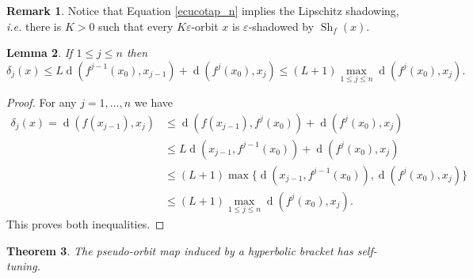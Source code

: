 \documentclass[12pt]{amsart}
\theoremstyle{plain}
\newtheorem{thm}{Theorem}[section]
\newtheorem{lem}[thm]{Lemma}
\theoremstyle{definition}
\newtheorem{rmk}[thm]{Remark}
\theoremstyle{remark}
\DeclareMathOperator{\dist}{d}
\DeclareMathOperator{\shm}{Sh}
\renewcommand{\epsilon}{\varepsilon}
\begin{document}
\begin{rmk}
	\label{rmkLipsSh}
	Notice that
	Equation \eqref{ecucotap_n}
	implies the Lipschitz shadowing, \textit{i.e.} there is $K>0$ such that every $K\epsilon$-orbit $x$ is $\epsilon$-shadowed by $\shm_f(x)$.
\end{rmk}

\begin{lem}
	\label{lemOrbPoCotas}
	If $1\leq j\leq n$ then
	\[
	\delta_j(x)\leq L\dist(f^{j-1}(x_0),x_{j-1})+\dist(f^j(x_0),x_j)
	\leq (L+1)\max_{1\leq j\leq n}\dist(f^j(x_0),x_j).
	\]
\end{lem}

\begin{proof}
	For any $j=1,\dots,n$ we have
	\begin{align*}
		\delta_j(x)=\dist(f(x_{j-1}),x_j)
		&\leq\dist(f(x_{j-1}),f^j(x_0))+\dist(f^j(x_0),x_j)		\\
		&\leq L \dist(x_{j-1},f^{j-1}(x_0))+\dist(f^j(x_0),x_j)\\
		&\leq (L+1)\max\{\dist(x_{j-1},f^{j-1}(x_0)),\dist(f^j(x_0),x_j)\}\\
		&\leq (L+1)\max_{1\leq j\leq n}\dist(f^j(x_0),x_j).
	\end{align*}
	This proves both inequalities.
\end{proof}

\begin{thm}
	\label{thmalmshinvshmbracket}
	The pseudo-orbit map induced by a hyperbolic bracket has self-tuning.
\end{thm}
\end{document}
